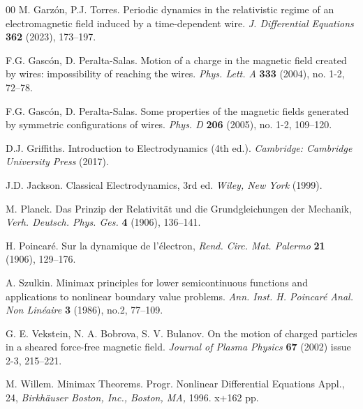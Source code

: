 \documentclass{article}
\theoremstyle{definition}
\begin{document}
\begin{thebibliography}{00}
		 M. Garz\'on, P.J. Torres. Periodic dynamics in the relativistic regime of an electromagnetic field induced by a time-dependent wire. \textsl{J. Differential Equations} {\bf 362} (2023), 173--197.
		
		 F.G. Gasc\'on, D. Peralta-Salas. Motion of a charge in the magnetic field created by wires: impossibility of reaching the wires. \textsl{Phys. Lett. A} {\bf 333} (2004), no. 1-2, 72--78.

		
		 F.G. Gasc\'on, D. Peralta-Salas. Some properties of the magnetic fields generated by symmetric configurations of wires. \textsl{Phys. D} {\bf 206} (2005), no. 1-2, 109--120.
		
		 D.J. Griffiths. Introduction to Electrodynamics (4th ed.). \textsl{Cambridge: Cambridge University Press} (2017).
		
		 J.D. Jackson. Classical Electrodynamics, 3rd ed. \textsl{Wiley, New York} (1999).
		
		 M. Planck. Das Prinzip der Relativit\"at und die Grundgleichungen der Mechanik, \textsl{Verh. Deutsch. Phys. Ges.} {\bf 4} (1906), 136--141.
		
		 H. Poincar\'e. Sur la dynamique de l'\'electron, \textsl{Rend. Circ. Mat. Palermo} {\bf 21} (1906), 129--176.
		
		 A. Szulkin. Minimax principles for lower semicontinuous functions and applications to nonlinear boundary value problems. \textsl{Ann. Inst. H. Poincar\'e Anal. Non Lin\'eaire} {\bf 3} (1986), no.2, 77--109.
        
          G. E. Vekstein, N. A. Bobrova, S. V. Bulanov. On the motion of charged particles in a sheared force-free magnetic field. \textsl{Journal of Plasma Physics} {\bf 67} (2002) issue 2-3, 215--221.
        
		 M. Willem. Minimax Theorems. Progr. Nonlinear Differential Equations Appl., 24, \textsl{Birkh\"auser Boston, Inc., Boston, MA,} 1996. x+162 pp. 
		
		
\end{thebibliography}
\end{document}
